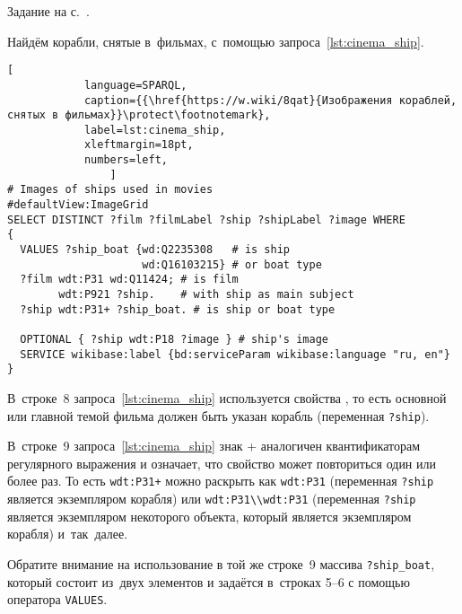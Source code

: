 \begin{task}
    \label{answer:ship_book}
    \AnswerBackref Задание на с.~\pageref{question:ship_book}.

    Найдём корабли, снятые в~фильмах, с~помощью запроса~\ref{lst:cinema_ship}. 

\begin{lstlisting}[ 
            language=SPARQL, 
            caption={{\href{https://w.wiki/8qat}{Изображения кораблей, снятых в фильмах}}\protect\footnotemark}, 
            label=lst:cinema_ship, 
            xleftmargin=18pt, 
            numbers=left,
                ]
# Images of ships used in movies
#defaultView:ImageGrid
SELECT DISTINCT ?film ?filmLabel ?ship ?shipLabel ?image WHERE
{
  VALUES ?ship_boat {wd:Q2235308   # is ship
                     wd:Q16103215} # or boat type
  ?film wdt:P31 wd:Q11424; # is film	
        wdt:P921 ?ship.    # with ship as main subject
  ?ship wdt:P31+ ?ship_boat. # is ship or boat type
    
  OPTIONAL { ?ship wdt:P18 ?image } # ship's image
  SERVICE wikibase:label {bd:serviceParam wikibase:language "ru, en"}
}
\end{lstlisting}

    В~строке~8 запроса~\ref{lst:cinema_ship} используется свойства , 
    то есть основной или главной темой фильма должен быть указан корабль 
    (переменная \lstinline|?ship|). 

    В~строке~9 запроса~\ref{lst:cinema_ship} знак + аналогичен квантификаторам регулярного выражения и означает, 
    что свойство  может повториться один или более раз. 
    То есть \lstinline|wdt:P31+| можно раскрыть как \lstinline|wdt:P31| (переменная \lstinline|?ship| является экземпляром корабля) 
    или \mbox{\lstinline|wdt:P31\\wdt:P31|} (переменная \lstinline|?ship| является экземпляром некоторого объекта, который является экземпляром корабля) 
    и~так~далее. 


    Обратите внимание на использование в той же строке~9 массива \lstinline|?ship_boat|, 
    который состоит из~двух элементов и задаётся в~строках 5--6 
    с помощью оператора \lstinline|VALUES|.



\end{task}
